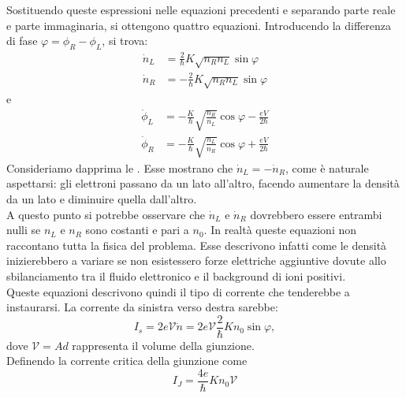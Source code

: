Sostituendo queste espressioni nelle equazioni precedenti e separando parte reale e parte immaginaria, si ottengono quattro equazioni. Introducendo la differenza di fase $\varphi=\phi_R-\phi_L$, si trova:
\begin{equation}
    \begin{split}
        \dot{n}_L
        &=
        \frac{2}{\hbar}
        K\sqrt{n_Rn_L}
        \sin\varphi
        \\[0.2cm]
        \dot{n}_R
        &=
        -
        \frac{2}{\hbar}
        K\sqrt{n_Rn_L}
        \sin\varphi
    \end{split}
    \label{eq:derivate_densità}
\end{equation}
e
\begin{equation}
    \begin{split}
        \dot{\phi}_L
        &=
        -
        \frac{K}{\hbar}
        \sqrt{\frac{n_R}{n_L}}
        \cos\varphi
        -
        \frac{eV}{2\hbar}
        \\[0.2cm]
        \dot{\phi}_R
        &=
        -
        \frac{K}{\hbar}
        \sqrt{\frac{n_L}{n_R}}
        \cos\varphi
        +
        \frac{eV}{2\hbar}
    \end{split}
    \label{eq:derivate_fasi}
\end{equation}
Consideriamo dapprima le . Esse mostrano che $\dot{n}_L=-\dot{n}_R$, come è naturale aspettarsi: gli elettroni passano da un lato all'altro, facendo aumentare la densità da un lato e diminuire quella dall'altro.\\
A questo punto si potrebbe osservare che $\dot{n}_L$ e $\dot{n}_R$ dovrebbero essere entrambi nulli se $n_L$ e $n_R$ sono costanti e pari a $n_0$. In realtà queste equazioni non raccontano tutta la fisica del problema. Esse descrivono infatti come le densità inizierebbero a variare se non esistessero forze elettriche aggiuntive dovute allo sbilanciamento tra il fluido elettronico e il background di ioni positivi.\\
Queste equazioni descrivono quindi il tipo di corrente che tenderebbe a instaurarsi. La corrente da sinistra verso destra sarebbe:
\begin{equation*}
    I_s
    =
    2e\mathcal{V}\dot{n}
    =
    2e\mathcal{V}
    \frac{2}{\hbar}
    Kn_0
    \sin\varphi,
\end{equation*}
dove $\mathcal{V}=Ad$ rappresenta il volume della giunzione.\\
Definendo la corrente critica della giunzione come
\begin{equation*}
    I_J
    =
    \frac{4e}{\hbar}
    Kn_0\mathcal{V}
\end{equation*}
